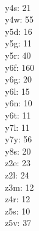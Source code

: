 \begin{multicols}{8}
  \\y4s: 21
  \\y4w: 55
  \\y5d: 16
  \\y5g: 11
  \\y5r: 40
  \\y6f: 160
  \\y6g: 20
  \\y6l: 15
  \\y6n: 10
  \\y6t: 11
  \\y7l: 11
  \\y7y: 56
  \\y8s: 20
  \\z2e: 23
  \\z2l: 24
  \\z3m: 12
  \\z4r: 12
  \\z5s: 10
  \\z5v: 37
\end{multicols}